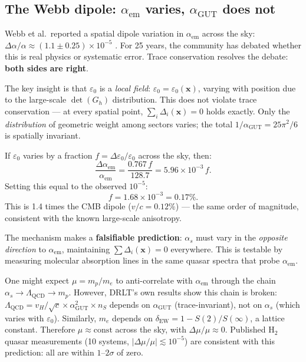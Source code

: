 \subsection{The Webb dipole: $\alpha_\text{em}$ varies, $\alpha_\text{GUT}$ does not}

Webb et al.\ reported a spatial dipole variation in $\alpha_\text{em}$ across the sky: $\Delta\alpha/\alpha \approx (1.1 \pm 0.25) \times 10^{-5}$ \cite{Webb}. For 25 years, the community has debated whether this is real physics or systematic error. Trace conservation resolves the debate: \textbf{both sides are right}.

The key insight is that $\varepsilon_0$ is a \emph{local field}: $\varepsilon_0 = \varepsilon_0(\mathbf{x})$, varying with position due to the large-scale $\det(G_h)$ distribution. This does not violate trace conservation --- at every spatial point, $\sum_i \Delta_i(\mathbf{x}) = 0$ holds exactly. Only the \emph{distribution} of geometric weight among sectors varies; the total $1/\alpha_\text{GUT} = 25\pi^2/6$ is spatially invariant.

If $\varepsilon_0$ varies by a fraction $f = \Delta\varepsilon_0/\varepsilon_0$ across the sky, then:
\begin{equation}
\frac{\Delta\alpha_\text{em}}{\alpha_\text{em}} = \frac{0.767\,f}{128.7} = 5.96 \times 10^{-3}\,f.
\end{equation}
Setting this equal to the observed $10^{-5}$:
\begin{equation}
f = 1.68 \times 10^{-3} = 0.17\%.
\end{equation}
This is 1.4 times the CMB dipole ($v/c = 0.12\%$) --- the same order of magnitude, consistent with the known large-scale anisotropy.

The mechanism makes a \textbf{falsifiable prediction}: $\alpha_s$ must vary in the \emph{opposite direction} to $\alpha_\text{em}$, maintaining $\sum\Delta_i(\mathbf{x}) = 0$ everywhere. This is testable by measuring molecular absorption lines in the same quasar spectra that probe $\alpha_\text{em}$.

\begin{remark}[$\mu = m_p/m_e$ is trace-protected]
One might expect $\mu = m_p/m_e$ to anti-correlate with $\alpha_\text{em}$ through the chain $\alpha_s \to \Lambda_\text{QCD} \to m_p$. However, DRLT's own results show this chain is broken: $\Lambda_\text{QCD} = v_H/\sqrt{c} \times \alpha_\text{GUT}^2 \times n_S$ depends on $\alpha_\text{GUT}$ (trace-invariant), not on $\alpha_s$ (which varies with $\varepsilon_0$). Similarly, $m_e$ depends on $\delta_\text{EW} = 1 - S(2)/S(\infty)$, a lattice constant. Therefore $\mu \approx \text{const}$ across the sky, with $\Delta\mu/\mu \approx 0$. Published H$_2$ quasar measurements (10 systems, $|\Delta\mu/\mu| \lesssim 10^{-5}$) are consistent with this prediction: all are within $1$--$2\sigma$ of zero.
\end{remark}

